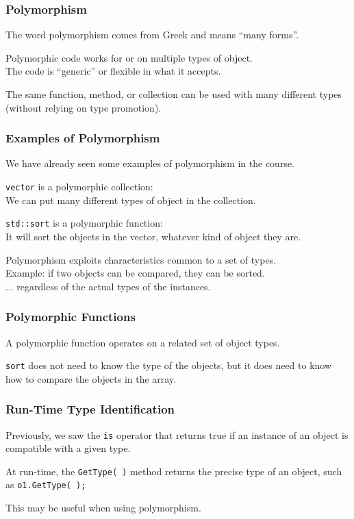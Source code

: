 \begin{frame}
\frametitle{Polymorphism}
The word polymorphism comes from Greek and means ``many forms''.

Polymorphic code works for or on multiple types of object.\\
\quad The code is ``generic'' or flexible in what it accepts.

The same function, method, or collection can be used with many different types (without relying on type promotion).

\end{frame}


\begin{frame}
\frametitle{Examples of Polymorphism}

We have already seen some examples of polymorphism in the course.

\texttt{vector} is a polymorphic collection:\\
\quad We can put many different types of object in the collection.

\texttt{std::sort} is a polymorphic function:\\
\quad It will sort the objects in the vector, whatever kind of object they are.



Polymorphism exploits characteristics common to a set of types.\\
\quad Example: if two objects can be compared, they can be sorted.\\
\quad ... regardless of the actual types of the instances.

\end{frame}


\begin{frame}
\frametitle{Polymorphic Functions}
A polymorphic function operates on a related set of object types.

\texttt{sort} does not need to know the type of the objects, but it does need to know how to compare the objects in the array.


\end{frame}


\begin{frame}
\frametitle{Run-Time Type Identification}
Previously, we saw the \texttt{is} operator that returns true if an instance of an object is compatible with a given type.

At run-time, the \texttt{GetType( )} method returns the precise type of an object, such as \texttt{o1.GetType( );}

This may be useful when using polymorphism.

\end{frame}


